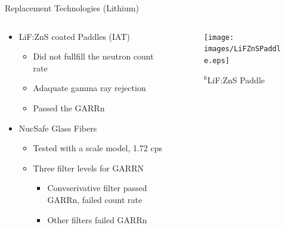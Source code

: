 \begin{frame}{Replacement Technologies (Lithium)}
\begin{columns}[onlytextwidth]
\begin{column}{0.45\textwidth}
\begin{itemize}
	\small
	\item LiF:ZnS coated Paddles (IAT) \cite{kouzes_lithium_2010}
	\begin{itemize}
		\tiny
		\item Did not fullfill the neutron count rate
		\item Adaquate gamma ray rejection
		\item Passed the GARRn
	\end{itemize}
	\small
	\item NucSafe Glass Fibers\cite{kouzes_alternative_2010}
	\begin{itemize}
		\tiny
		\item Tested with a scale model, 1.72 cps
		\item Three filter levels for GARRN
		\begin{itemize}
			\tiny
			\item Convserivative filter passed GARRn, failed count rate
			\item Other filters failed GARRn
		\end{itemize}
	\end{itemize}
\end{itemize}
\end{column}
\begin{column}{0.45\textwidth}
	\begin{figure}
		\texttt{[image: images/LiFZnSPaddle.eps]}
		\caption{${}^6$LiF:ZnS Paddle}
		\label{fig:LifZnSPaddle}

\end{figure}
\end{column}
\end{columns}
\end{frame}
